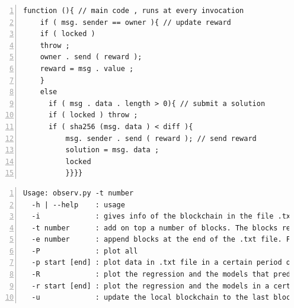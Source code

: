 \documentclass[USenglish]{uit-thesis}
\begin{document}
\begin{appendices}
\begin{lstlisting}[float, numbers=left,frame=single,caption={Example of a smart contract that rewards users who solve a computational puzzle~\cite{smartcontracts}.}]
  function (){ // main code , runs at every invocation
    if ( msg. sender == owner ){ // update reward
    if ( locked )
    throw ;
    owner . send ( reward );
    reward = msg . value ;
    }
    else
      if ( msg . data . length > 0){ // submit a solution
      if ( locked ) throw ;
      if ( sha256 (msg. data ) < diff ){
          msg. sender . send ( reward ); // send reward
          solution = msg. data ;
          locked
          }}}}
\end{lstlisting}

\begin{lstlisting}[float, numbers=left, frame=single, caption={Application usage.}]
Usage: observ.py -t number
  -h | --help    : usage
  -i             : gives info of the blockchain in the file .txt
  -t number      : add on top a number of blocks. The blocks retreived will be the most recent ones. If the blockchain growth more than the block requested do -u (update)
  -e number      : append blocks at the end of the .txt file. Fetch older blocks starting from the last retrieved
  -P             : plot all
  -p start [end] : plot data in .txt file in a certain period of time, from start to end. If only start then consider from start to the end of the .txt file
  -R             : plot the regression and the models that predict the blockchain
  -r start [end] : plot the regression and the models in a certain period of time, from start to end. If only start then consider from start to the end of the .txt file
  -u             : update the local blockchain to the last block created

\end{lstlisting}




\end{appendices}
\end{document}
